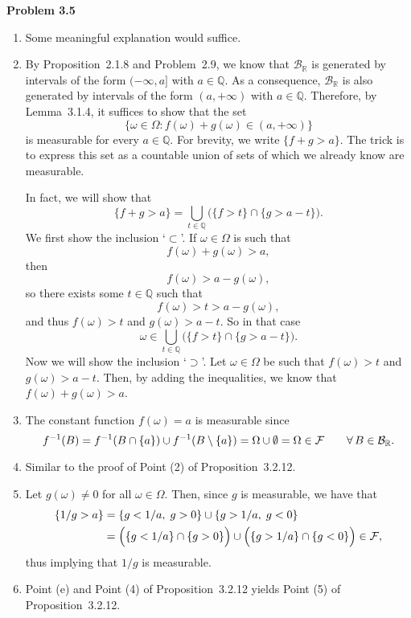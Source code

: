 \textbf{Problem 3.5}
\begin{enumerate}[label=(\alph*)]
	\item Some meaningful explanation would suffice.
	
	\item By Proposition~2.1.8 and Problem~2.9, we know that $\mathcal{B}_\mathbb{R}$ is generated by intervals of the form $(-\infty,a]$ with $a \in \mathbb{Q}$. 
As a consequence, $\mathcal{B}_\mathbb{R}$ is also generated by intervals of the form $(a, +\infty)$ with $a \in \mathbb{Q}$.
Therefore, by Lemma~3.1.4, it suffices to show that the set
\[
	\bigl\{ \omega \in \Omega : f(\omega) + g(\omega) \in (a,+\infty) \bigr\}
\]
is measurable for every $a \in \mathbb{Q}$. For brevity, we write $\{ f + g > a\}$. The trick is to express this set as a countable union of sets of which we already know are measurable.

In fact, we will show that
\[
	\{ f + g > a\} = \bigcup_{t \in \mathbb{Q}} \Big(\{ f > t \} \cap \{ g > a - t  \} \Big).
\]
We first show the inclusion `$\subset$'. If $\omega \in \Omega$ is such that
\[
	f(\omega) + g(\omega) > a,
\]
then 
\[
	f(\omega) > a - g(\omega),
\]
so there exists some $t \in \mathbb{Q}$ such that
\[
	f(\omega) > t > a - g(\omega),
\]
and thus $f(\omega) > t$ and $g(\omega) > a - t$.
So in that case
\[
	\omega \in \bigcup_{t \in \mathbb{Q}}\Big(\{ f > t \} \cap \{ g > a - t  \}\Big).
\]
Now we will show the inclusion `$\supset$'. 
Let $\omega \in \Omega$ be such that $f(\omega) > t$ and $g(\omega) > a - t$. 
Then, by adding the inequalities, we know that $f(\omega) + g(\omega) > a$. 

	\item The constant function $f(\omega)=a$ is measurable since 
	\[
		f^{-1}(B) = f^{-1}(B\cap\{a\})\cup f^{-1}(B\setminus \{a\}) = \Omega\cup \emptyset = \Omega\in \mathcal F\qquad\forall\,B\in\mathcal B_{\mathbb R}.
	\]
	
	\item Similar to the proof of Point (2) of Proposition~3.2.12.
	\item Let $g(\omega)\ne 0$ for all $\omega\in\Omega$. Then, since $g$ is measurable, we have that
	\begin{align*}
		\{ 1/g > a\} &= \{ g < 1/a,\;g>0\}\cup \{ g > 1/a,\; g<0\} \\
		&= \Bigl(\{ g < 1/a\}\cap \{g>0\}\Bigr) \cup \Bigl(\{ g > 1/a\}\cap\{g<0\}\Bigr) \in \mathcal F,
	\end{align*}
	thus implying that $1/g$ is measurable.
	
	\item Point (e) and Point (4) of Proposition~3.2.12 yields Point (5) of Proposition~3.2.12.
\end{enumerate}

